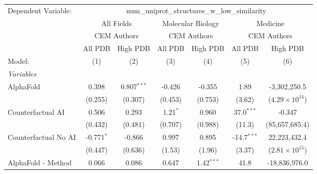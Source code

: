 \begingroup
\centering
\begin{tabular}{lcccccc}
   \tabularnewline \midrule \midrule
   Dependent Variable: & \multicolumn{6}{c}{num\_uniprot\_structures\_w\_low\_similarity}\\
 & \multicolumn{2}{c}{All Fields} & \multicolumn{2}{c}{Molecular Biology} & \multicolumn{2}{c}{Medicine} \\
\cmidrule(lr){2-3} \cmidrule(lr){4-5} \cmidrule(lr){6-7}
 & \multicolumn{2}{c}{CEM Authors} & \multicolumn{2}{c}{CEM Authors} & \multicolumn{2}{c}{CEM Authors} \\
\cmidrule(lr){2-3} \cmidrule(lr){4-5} \cmidrule(lr){6-7}
 & \multicolumn{1}{c}{All PDB} & \multicolumn{1}{c}{High PDB} & \multicolumn{1}{c}{All PDB} & \multicolumn{1}{c}{High PDB} & \multicolumn{1}{c}{All PDB} & \multicolumn{1}{c}{High PDB} \\
\cmidrule(lr){2-2} \cmidrule(lr){3-3} \cmidrule(lr){4-4} \cmidrule(lr){5-5} \cmidrule(lr){6-6} \cmidrule(lr){7-7}
   Model:                                                     & (1)           & (2)           & (3)           & (4)           & (5)           & (6)\\  
   \midrule
   \emph{Variables}\\
   AlphaFold                                                  & 0.398         & 0.807$^{***}$ & -0.426        & -0.355        & 1.89          & -3,302,250.5\\   
                                                              & (0.255)       & (0.307)       & (0.453)       & (0.753)       & (3.62)        & ($4.29\times 10^{14}$)\\    
   Counterfactual AI                                          & 0.506         & 0.293         & 1.21$^{*}$    & 0.960         & 37.0$^{***}$  & -0.347\\   
                                                              & (0.432)       & (0.481)       & (0.707)       & (0.988)       & (11.3)        & (85,657,685.4)\\   
   Counterfactual No AI                                       & -0.771$^{*}$  & -0.866        & 0.997         & 0.895         & -14.7$^{***}$ & 22,223,432.4\\   
                                                              & (0.447)       & (0.636)       & (1.53)        & (1.96)        & (3.37)        & ($2.81\times 10^{15}$)\\    
   AlphaFold - Method                                         & 0.066         & 0.086         & 0.647         & 1.42$^{***}$  & 41.8          & -18,836,976.0\\   

\end{tabular}
